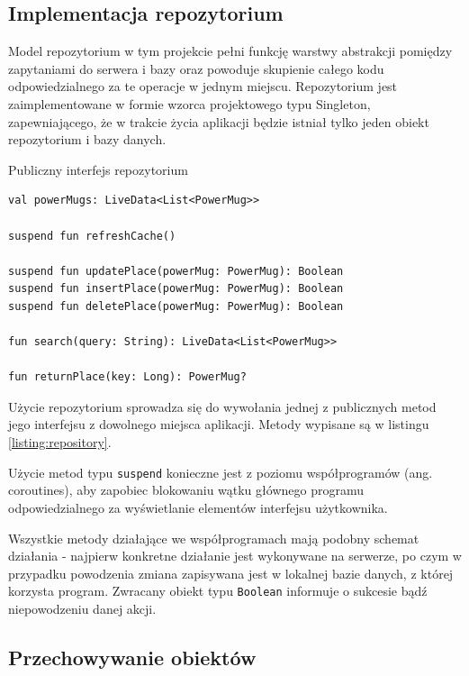 \documentclass[polish,polish,a4paper,12pt]{article}
\begin{document}
	\subsection{Implementacja repozytorium}

	Model repozytorium w tym projekcie pełni funkcję warstwy abstrakcji pomiędzy zapytaniami do serwera i bazy oraz powoduje skupienie całego kodu odpowiedzialnego za te operacje w jednym miejscu. Repozytorium jest zaimplementowane w formie wzorca projektowego typu Singleton, zapewniającego, że w trakcie życia aplikacji będzie istniał tylko jeden obiekt repozytorium i bazy danych.

	\begin{listing}[H]
		\caption{Publiczny interfejs repozytorium}
		\begin{verbatim}
val powerMugs: LiveData<List<PowerMug>>

suspend fun refreshCache()

suspend fun updatePlace(powerMug: PowerMug): Boolean
suspend fun insertPlace(powerMug: PowerMug): Boolean
suspend fun deletePlace(powerMug: PowerMug): Boolean

fun search(query: String): LiveData<List<PowerMug>>

fun returnPlace(key: Long): PowerMug?
		\end{verbatim}
		\label{listing:repository}
	\end{listing}

	Użycie repozytorium sprowadza się do wywołania jednej z publicznych metod jego interfejsu z dowolnego miejsca aplikacji. Metody wypisane są w listingu \ref{listing:repository}.

	Użycie metod typu \texttt{suspend} konieczne jest z poziomu współprogramów (ang. coroutines), aby zapobiec blokowaniu wątku głównego programu odpowiedzialnego za wyświetlanie elementów interfejsu użytkownika.

	Wszystkie metody działające we współprogramach mają podobny schemat działania - najpierw konkretne działanie jest wykonywane na serwerze, po czym w przypadku powodzenia zmiana zapisywana jest w lokalnej bazie danych, z której korzysta program. Zwracany obiekt typu \texttt{Boolean} informuje o sukcesie bądź niepowodzeniu danej akcji.

	\subsection{Przechowywanie obiektów}
\end{document}
